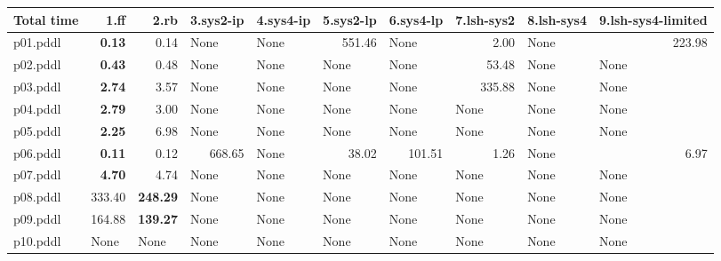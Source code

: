 \documentclass{article}
\begin{document}
\begin{tabular}{@{}lrrrrrrrrr@{}}
Total time & 1.ff & 2.rb & 3.sys2-ip & 4.sys4-ip & 5.sys2-lp & 6.sys4-lp & 7.lsh-sys2 & 8.lsh-sys4 & 9.lsh-sys4-limited \\
\midrule
p01.pddl & \textbf{0.13} & 0.14 & \multicolumn{1}{|l|}{None} & \multicolumn{1}{|l|}{None} & 551.46 & \multicolumn{1}{|l|}{None} & 2.00 & \multicolumn{1}{|l|}{None} & 223.98 \\
p02.pddl & \textbf{0.43} & 0.48 & \multicolumn{1}{|l|}{None} & \multicolumn{1}{|l|}{None} & \multicolumn{1}{|l|}{None} & \multicolumn{1}{|l|}{None} & 53.48 & \multicolumn{1}{|l|}{None} & \multicolumn{1}{|l|}{None} \\
p03.pddl & \textbf{2.74} & 3.57 & \multicolumn{1}{|l|}{None} & \multicolumn{1}{|l|}{None} & \multicolumn{1}{|l|}{None} & \multicolumn{1}{|l|}{None} & 335.88 & \multicolumn{1}{|l|}{None} & \multicolumn{1}{|l|}{None} \\
p04.pddl & \textbf{2.79} & 3.00 & \multicolumn{1}{|l|}{None} & \multicolumn{1}{|l|}{None} & \multicolumn{1}{|l|}{None} & \multicolumn{1}{|l|}{None} & \multicolumn{1}{|l|}{None} & \multicolumn{1}{|l|}{None} & \multicolumn{1}{|l|}{None} \\
p05.pddl & \textbf{2.25} & 6.98 & \multicolumn{1}{|l|}{None} & \multicolumn{1}{|l|}{None} & \multicolumn{1}{|l|}{None} & \multicolumn{1}{|l|}{None} & \multicolumn{1}{|l|}{None} & \multicolumn{1}{|l|}{None} & \multicolumn{1}{|l|}{None} \\
p06.pddl & \textbf{0.11} & 0.12 & 668.65 & \multicolumn{1}{|l|}{None} & 38.02 & 101.51 & 1.26 & \multicolumn{1}{|l|}{None} & 6.97 \\
p07.pddl & \textbf{4.70} & 4.74 & \multicolumn{1}{|l|}{None} & \multicolumn{1}{|l|}{None} & \multicolumn{1}{|l|}{None} & \multicolumn{1}{|l|}{None} & \multicolumn{1}{|l|}{None} & \multicolumn{1}{|l|}{None} & \multicolumn{1}{|l|}{None} \\
p08.pddl & 333.40 & \textbf{248.29} & \multicolumn{1}{|l|}{None} & \multicolumn{1}{|l|}{None} & \multicolumn{1}{|l|}{None} & \multicolumn{1}{|l|}{None} & \multicolumn{1}{|l|}{None} & \multicolumn{1}{|l|}{None} & \multicolumn{1}{|l|}{None} \\
p09.pddl & 164.88 & \textbf{139.27} & \multicolumn{1}{|l|}{None} & \multicolumn{1}{|l|}{None} & \multicolumn{1}{|l|}{None} & \multicolumn{1}{|l|}{None} & \multicolumn{1}{|l|}{None} & \multicolumn{1}{|l|}{None} & \multicolumn{1}{|l|}{None} \\
p10.pddl & \multicolumn{1}{|l|}{None} & \multicolumn{1}{|l|}{None} & \multicolumn{1}{|l|}{None} & \multicolumn{1}{|l|}{None} & \multicolumn{1}{|l|}{None} & \multicolumn{1}{|l|}{None} & \multicolumn{1}{|l|}{None} & \multicolumn{1}{|l|}{None} & \multicolumn{1}{|l|}{None} \\

\end{tabular}
\end{document}
